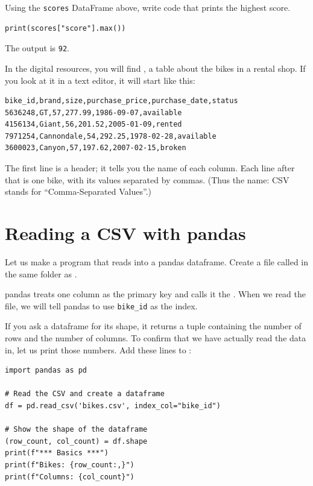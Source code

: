 \begin{Exercise}[title={Highest Score}, label=pd1]
Using the \texttt{scores} DataFrame above, write code that prints the highest score.
\end{Exercise}
\begin{Answer}[ref=pd1]
\begin{verbatim}
print(scores["score"].max())
\end{verbatim}
The output is \texttt{92}.
\end{Answer}

In the digital resources, you will find , a table
about the bikes in a rental shop. If you
look at it in a text editor, it will start like this:
\begin{verbatim}
bike_id,brand,size,purchase_price,purchase_date,status
5636248,GT,57,277.99,1986-09-07,available
4156134,Giant,56,201.52,2005-01-09,rented
7971254,Cannondale,54,292.25,1978-02-28,available
3600023,Canyon,57,197.62,2007-02-15,broken
\end{verbatim}

The first line is a header; it tells you the name of each column.
Each line after that is one bike, with its values separated by commas. (Thus the name: CSV stands
for ``Comma-Separated Values''.)

\section{Reading a CSV with pandas}

Let us make a program that reads  into a pandas
dataframe.  Create a file called  in the same
folder as .

pandas treats one column as the primary key and calls it the
. When we read the file, we will tell
pandas to use \texttt{bike\_id} as the index.

If you ask a dataframe for its shape, it returns a tuple containing
the number of rows and the number of columns. To confirm that we have
actually read the data in, let us print those numbers.  Add these lines
to :

\begin{verbatim}
import pandas as pd

# Read the CSV and create a dataframe
df = pd.read_csv('bikes.csv', index_col="bike_id")

# Show the shape of the dataframe
(row_count, col_count) = df.shape
print(f"*** Basics ***")
print(f"Bikes: {row_count:,}")
print(f"Columns: {col_count}")
\end{verbatim}


